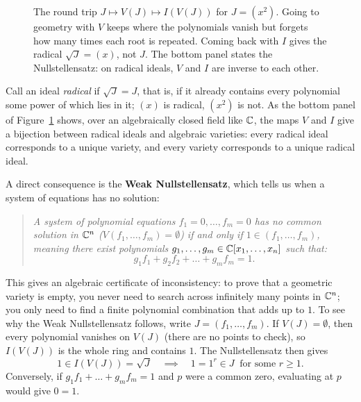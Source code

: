 \begin{figure}[htbp]
\caption{The round trip $J \mapsto V(J) \mapsto I(V(J))$ for $J = (x^2)$. Going to geometry with $V$ keeps where the polynomials vanish but forgets how many times each root is repeated. Coming back with $I$ gives the radical $\sqrt{J} = (x)$, not $J$. The bottom panel states the Nullstellensatz: on radical ideals, $V$ and $I$ are inverse to each other.}\label{alggeom:fig-nullstellensatz-loop}
\end{figure}

Call an ideal \emph{radical} if $\sqrt{J} = J$, that is, if it already contains every polynomial some power of which lies in it; $(x)$ is radical, $(x^2)$ is not. As the bottom panel of Figure~\ref{alggeom:fig-nullstellensatz-loop} shows, over an algebraically closed field like $\mathbb{C}$, the maps $V$ and $I$ give a bijection between radical ideals and algebraic varieties: every radical ideal corresponds to a unique variety, and every variety corresponds to a unique radical ideal.

A direct consequence is the \textbf{Weak Nullstellensatz}, which tells us when a system of equations has no solution:
\begin{quote}
\emph{A system of polynomial equations $f_1 = 0, \dots, f_m = 0$ has no common solution in $\mathbb{C}^n$ ($V(f_1, \dots, f_m) = \emptyset$) if and only if $1 \in (f_1, \dots, f_m)$, meaning there exist polynomials $g_1, \dots, g_m \in \mathbb{C}[x_1, \dots, x_n]$ such that:}
\[
g_1 f_1 + g_2 f_2 + \dots + g_m f_m = 1.
\]
\end{quote}
This gives an algebraic certificate of inconsistency: to prove that a geometric variety is empty, you never need to search across infinitely many points in $\mathbb{C}^n$; you only need to find a finite polynomial combination that adds up to $1$. To see why the Weak Nullstellensatz follows, write $J = (f_1, \dots, f_m)$. If $V(J) = \emptyset$, then every polynomial vanishes on $V(J)$ (there are no points to check), so $I(V(J))$ is the whole ring and contains $1$. The Nullstellensatz then gives
\[
1 \in I(V(J)) = \sqrt{J} \quad\implies\quad 1 = 1^r \in J \ \text{ for some } r \ge 1.
\]
Conversely, if $g_1 f_1 + \dots + g_m f_m = 1$ and $p$ were a common zero, evaluating at $p$ would give $0 = 1$.

